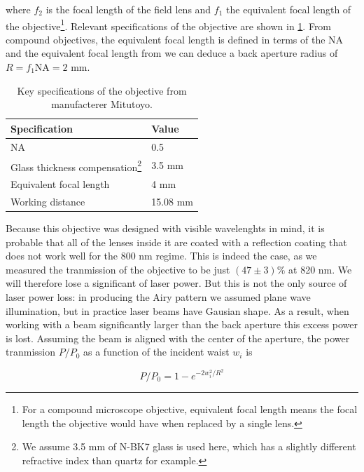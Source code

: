 where $f_2$ is the focal length of the field lens and $f_1$ the equivalent focal length of the objective\footnote{For a compound microscope objective, equivalent focal length means the focal length the objective would have when replaced by a single lens.}. Relevant specifications of the objective are shown in \cref{table:MitutoyoSpecs}. 
From compound objectives, the equivalent focal length is defined in terms of the \ac{NA} and the equivalent focal length from we can deduce a back aperture radius of $R = f_1 \text{NA} = 2$ mm. 

\begin{table}[h]
    \centering
    \caption{Key specifications of the objective from manufacterer Mitutoyo.}
    \label{table:MitutoyoSpecs}
    \begin{tabular}{l | l}
        \textbf{Specification}       & \textbf{Value} \\ \hline 
        NA                           & 0.5            \\ \hline
        Glass thickness compensation\footnote{We assume 3.5 mm of N-BK7 glass is used here, which has a slightly different refractive index than quartz for example.} & 3.5 mm         \\ \hline
        Equivalent focal length      & 4 mm           \\ \hline
        Working distance             & 15.08 mm      
    \end{tabular}
\end{table}

Because this objective was designed with visible wavelenghts in mind, it is probable that all of the lenses inside it are coated with a reflection coating that does not work well for the 800 nm regime. 
This is indeed the case, as we measured the tranmission of the objective to be just $(47 \pm 3)\%$ at 820 nm. We will therefore lose a significant of laser power. 
But this is not the only source of laser power loss: in producing the Airy pattern we assumed plane wave illumination, but in practice laser beams have Gausian shape. 
As a result, when working with a beam significantly larger than the back aperture this excess power is lost. 
Assuming the beam is aligned with the center of the aperture, the power tranmission $P/P_0$ as a function of the incident waist $w_i$ is

\begin{equation}\label{eq:fracPowerCircular}
    P/P_0 = 1 - e^{-2w_i^2/R^2}
\end{equation}

